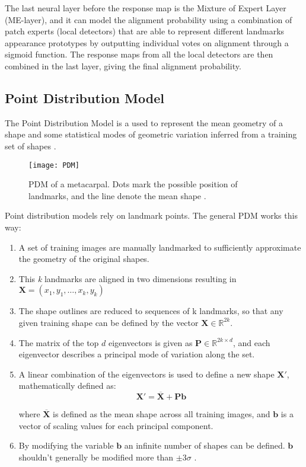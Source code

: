 The last neural layer before the response map is the Mixture of Expert Layer (ME-layer), and it can model the alignment probability using a combination of patch experts (local detectors) that are able to represent different landmarks appearance prototypes by outputting individual votes on alignment through a sigmoid function. The response maps from all the local detectors are then combined in the last layer, giving the final alignment probability.

\subsection{Point Distribution Model}
The Point Distribution Model is a used to represent the mean geometry of a shape and some statistical modes of geometric variation inferred from a training set of shapes \cite{wiki:PDM}. 

\begin{figure}[H]
	\centering
	\texttt{[image: PDM]}
	\caption{PDM of a metacarpal. Dots mark the possible position of landmarks, and the line denote the mean shape \cite{PDM}.}
	\label{fig:PDM}
\end{figure}

Point distribution models rely on landmark points. The general PDM works this way:
\begin{enumerate}
	\item A set of training images are manually landmarked to sufficiently approximate the geometry of the original shapes. 
	\item This \textit{k} landmarks are aligned in two dimensions resulting in \\
	$\mathbf{X} = (x_1,y_1, \dots, x_k, y_k)$
	\item The shape outlines are reduced to sequences of k landmarks, so that any given training shape can be defined by the vector $\mathbf{X} \in {\mathbb{R} ^{2k}}$.
	\item The matrix of the top $d$ eigenvectors is given as $\mathbf{P} \in \mathbb{R}^{2k \times d}$, and each eigenvector describes a principal mode of variation along the set.
	\item A linear combination of the eigenvectors is used to define a new shape $ \mathbf{X} '$, mathematically defined as: 
	\begin{equation}
	\mathbf {X}' = {\overline {\mathbf {X}} + \mathbf{P} \mathbf{b}}
	\end{equation}
	
	where $ {\overline {\mathbf {X}}}$ is defined as the mean shape across all training images, and $\mathbf {b}$ is a vector of scaling values for each principal component. 
	\item By modifying the variable $\mathbf {b}$  an infinite number of shapes can be defined. $\mathbf {b}$ shouldn't generally be modified more than $\pm3\sigma$ \cite{wiki:PDM}.
\end{enumerate}

